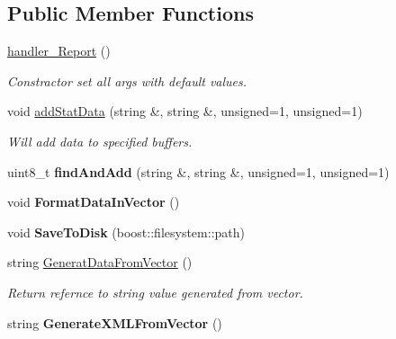 \subsection*{Public Member Functions}
\begin{DoxyCompactItemize}
\item 
\hypertarget{classhandler__Report_a69a82b65c02449796be662b897ee56fc}{
\hyperlink{classhandler__Report_a69a82b65c02449796be662b897ee56fc}{handler\_\-Report} ()}
\label{classhandler__Report_a69a82b65c02449796be662b897ee56fc}

\begin{DoxyCompactList}\small\item\em Constractor set all args with default values. \item\end{DoxyCompactList}\item 
\hypertarget{classhandler__Report_ae03757935a7d0ee9a4b1a8ef15b54040}{
void \hyperlink{classhandler__Report_ae03757935a7d0ee9a4b1a8ef15b54040}{addStatData} (string \&, string \&, unsigned=1, unsigned=1)}
\label{classhandler__Report_ae03757935a7d0ee9a4b1a8ef15b54040}

\begin{DoxyCompactList}\small\item\em Will add data to specified buffers. \item\end{DoxyCompactList}\item 
\hypertarget{classhandler__Report_af493d5f27da28ae1f611315208a98b83}{
uint8\_\-t {\bfseries findAndAdd} (string \&, string \&, unsigned=1, unsigned=1)}
\label{classhandler__Report_af493d5f27da28ae1f611315208a98b83}

\item 
\hypertarget{classhandler__Report_a56de9bfebe51073d5d85d0660418cd06}{
void {\bfseries FormatDataInVector} ()}
\label{classhandler__Report_a56de9bfebe51073d5d85d0660418cd06}

\item 
\hypertarget{classhandler__Report_a566af7550041c738548f29da0fd4a9ea}{
void {\bfseries SaveToDisk} (boost::filesystem::path)}
\label{classhandler__Report_a566af7550041c738548f29da0fd4a9ea}

\item 
\hypertarget{classhandler__Report_ab389a775c2650f0a5954be52c9a362a3}{
string \hyperlink{classhandler__Report_ab389a775c2650f0a5954be52c9a362a3}{GeneratDataFromVector} ()}
\label{classhandler__Report_ab389a775c2650f0a5954be52c9a362a3}

\begin{DoxyCompactList}\small\item\em Return refernce to string value generated from vector. \item\end{DoxyCompactList}\item 
\hypertarget{classhandler__Report_ae9889e1bb0a6a23d35a7a513a2f4056f}{
string {\bfseries GenerateXMLFromVector} ()}
\label{classhandler__Report_ae9889e1bb0a6a23d35a7a513a2f4056f}

\end{DoxyCompactItemize}
